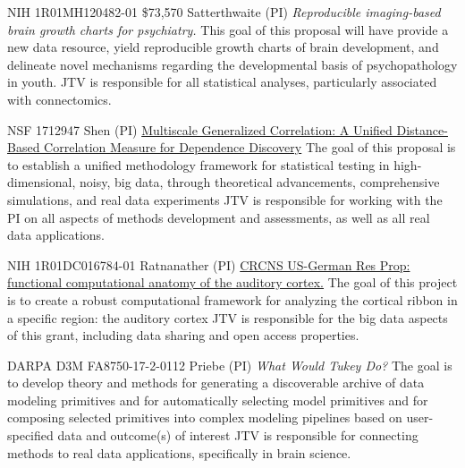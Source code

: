 \documentclass[10pt,colorlinks=true,urlcolor=blue]{moderncv}
\begin{document}
        
    {NIH 1R01MH120482-01}%
    {\$73,570} 
    {Satterthwaite (PI)}
    {\emph{Reproducible imaging-based brain growth charts for psychiatry.} 
    This  goal of this proposal will have provide a new data resource, yield reproducible growth charts of brain development, and delineate novel mechanisms regarding the developmental basis of psychopathology in youth.}
    {JTV is responsible for all statistical analyses, particularly associated with connectomics.}
    {}


    {NSF 1712947}%
    {} 
    {Shen (PI)}
    {\href{http://grantome.com/grant/NSF/DMS-1921310}%
    {Multiscale Generalized Correlation: A Unified Distance-Based Correlation Measure for Dependence Discovery} 
    The  goal of this proposal is to establish a unified methodology framework for statistical testing in high-dimensional, noisy, big data, through theoretical advancements, comprehensive simulations, and real data experiments}%
    {JTV is responsible for working with the PI on all aspects of methods development and assessments, as well as all real data applications.}
    {}


    {NIH 1R01DC016784-01}%
    {} 
    {Ratnanather (PI)}
    {\href{http://grantome.com/grant/NIH/R01-DC016784-02}%
    {CRCNS US-German Res Prop: functional computational anatomy of the auditory cortex.} 
    The goal of this project is to create a robust computational framework for analyzing the cortical ribbon in a specific region: the auditory cortex}
    {JTV is responsible for the big data aspects of this grant, including data sharing and open access properties.}
    {}


%
    {DARPA D3M FA8750-17-2-0112}%
    {}%
    {Priebe (PI)}
    {\emph{What Would Tukey Do?} 
    The goal is to develop theory and methods for generating a discoverable archive of data modeling primitives and for automatically selecting model primitives and for composing selected primitives into complex modeling pipelines based on user-specified data and outcome(s) of interest}%
    {JTV is responsible for connecting methods to real data applications, specifically in brain science.}
    {}
\end{document}
